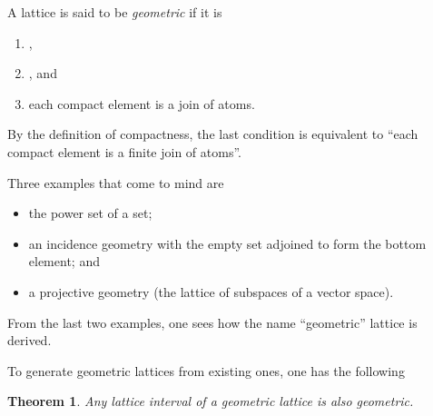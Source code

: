 \documentclass[12pt]{article}
\newtheorem*{thm}{Theorem}
\begin{document}
A lattice is said to be \emph{geometric} if it is 
\begin{enumerate}
\item {},
\item {}, and
\item each compact element is a join of atoms.
\end{enumerate}

By the definition of compactness, the last condition is equivalent to ``each compact element is a finite join of atoms''.

Three examples that come to mind are 
\begin{itemize}
\item the power set of a set;
\item an incidence geometry with the empty set adjoined to form the bottom element; and
\item a projective geometry (the lattice of subspaces of a vector space).
\end{itemize}

From the last two examples, one sees how the name ``geometric'' lattice is derived.

To generate geometric lattices from existing ones, one has the following

\begin{thm} Any lattice interval of a geometric lattice is also geometric.\end{thm}
\end{document}

